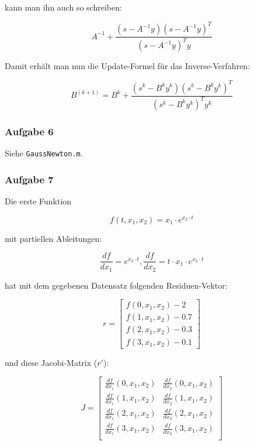 \documentclass[a4paper, 12pt]{report}
\begin{document}
kann man ihn auch so schreiben:

$$ A^{-1} + \frac{ (s - A^{-1}y )(s - A^{-1}y)^T }{ (s - A^{-1}y)^Ty } $$

Damit erhält man nun die Update-Formel für das Inverse-Verfahren:

$$B^{(k+1)} = B^{k} + \frac{(s^k - B^ky^k)(s^k - B^ky^k)^T}{(s^k-B^ky^k)^Ty^k}$$

\subsubsection{Aufgabe 6}

Siehe \lstinline[basicstyle=\ttfamily\color{black}]|GaussNewton.m|.

\subsubsection{Aufgabe 7}

Die erste Funktion

$$f(t, x_1, x_2) = x_1\cdot e^{x_2\cdot t}$$

mit partiellen Ableitungen:

$$\frac{df}{dx_1} = e^{x_2\cdot t} , \frac{df}{dx_2} = t\cdot x_1 \cdot e^{x_2\cdot t} $$

hat mit dem gegebenen Datensatz folgenden Residuen-Vektor:

\def\arraystretch{1.25}
$$r = \begin{bmatrix} f(0, x_1, x_2) - 2 \\ f(1, x_1, x_2) - 0.7 \\ f(2, x_1, x_2) - 0.3 \\ f(3, x_1, x_2) - 0.1\end{bmatrix}$$

und diese Jacobi-Matrix ($r'$):

$$ J = \begin{bmatrix}
  \frac{df}{dx_1}(0, x_1, x_2) & \frac{df}{dx_2}(0, x_1, x_2)\\
  \frac{df}{dx_1}(1, x_1, x_2) & \frac{df}{dx_2}(1, x_1, x_2)\\
  \frac{df}{dx_1}(2, x_1, x_2) & \frac{df}{dx_2}(2, x_1, x_2)\\
  \frac{df}{dx_1}(3, x_1, x_2) & \frac{df}{dx_2}(3, x_1, x_2)\\
\end{bmatrix}$$
\end{document}
